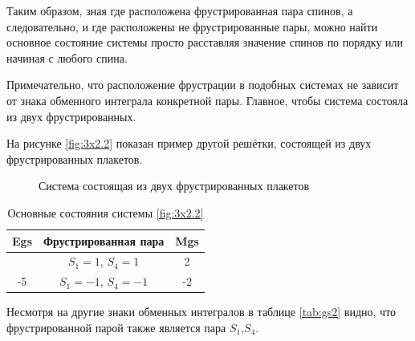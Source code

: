 \documentclass[utf8, babel, sor, jor, amsmath, amssymb, reprint]{elsarticle} %
\begin{document}
Таким образом, зная где расположена фрустрированная пара спинов, а следовательно, и где расположены не фрустрированные пары, можно найти основное состояние системы просто расставляя значение спинов по порядку или начиная с любого спина. 

Примечательно, что расположение фрустрации в подобных системах не зависит от знака обменного интеграла конкретной пары. Главное, чтобы система состояла из двух фрустрированных.


На рисунке \eqref{fig:3x2.2} показан пример другой решётки, состоящей из двух фрустрированных плакетов.

\begin{figure}[H]
	\centering
	\begin{minipage}{0.3\textwidth}
		\centering
		\caption{Система состоящая из двух фрустрированных плакетов}
		\label{fig:3x2.2}
	\end{minipage}
\end{figure}


\begin{table}[H]
	\centering
	\begin{tabular}{|c|c|c|}
		\hline
		Egs   &   Фрустрированная пара & Mgs \\
		\hline
		   &  $S_1=1$, $S_4=1$ & 2 \\
		\cline{2-3}
		-5	\multirow{3}{*}{}
		 &   $S_1=-1$, $S_4=-1$ & -2 \\
		\hline
	\end{tabular}
	\caption{Основные состояния системы \eqref{fig:3x2.2}}
	\label{tab:gs2}
\end{table}

Несмотря на другие знаки обменных интегралов в таблице \eqref{tab:gs2} видно, что фрустрированной парой также является пара $S_1$,$S_4$.
\end{document}

